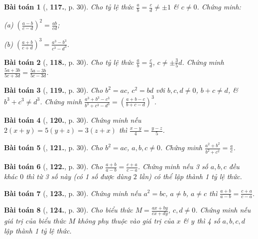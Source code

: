 \documentclass{article}
\numberwithin{equation}{section}
\newtheorem{baitoan}{Bài toán}
\begin{document}
\begin{baitoan}[\cite{Tuyen_Toan_7}, \textbf{117.}, p. 30]
	Cho tỷ lệ thức $\frac{a}{b} = \frac{c}{d}\ne\pm 1$ \& $c\ne 0$. Chứng minh:
	\begin{enumerate*}
		\item[(a)] $\left(\frac{a - b}{c - d}\right)^2 = \frac{ab}{cd}$;
		\item[(b)] $\left(\frac{a + b}{c + d}\right)^3 = \frac{a^3 - b^3}{c^3 - d^3}$.
	\end{enumerate*}
\end{baitoan}

\begin{baitoan}[\cite{Tuyen_Toan_7}, \textbf{118.}, p. 30]
	Cho tỷ lệ thức $\frac{a}{b} = \frac{c}{d}$, $c\ne\pm\frac{3}{5}d$. Chứng minh $\frac{5a + 3b}{5c + 3d} = \frac{5a - 3b}{5c - 3d}$.
\end{baitoan}

\begin{baitoan}[\cite{Tuyen_Toan_7}, \textbf{119.}, p. 30]
	Cho $b^2 = ac$, $c^2 = bd$ với $b,c,d\ne 0$, $b + c\ne d$, \& $b^3 + c^3\ne d^3$. Chứng minh $\frac{a^3 + b^3 - c^3}{b^3 + c^3 - d^3} = \left(\frac{a + b - c}{b + c - d}\right)^3$.
\end{baitoan}

\begin{baitoan}[\cite{Tuyen_Toan_7}, \textbf{120.}, p. 30]
	Chứng minh nếu $2(x + y) = 5(y + z) = 3(z + x)$ thì $\frac{x - y}{4} = \frac{y - z}{5}$.
\end{baitoan}

\begin{baitoan}[\cite{Tuyen_Toan_7}, \textbf{121.}, p. 30]
	Cho $b^2 = ac$, $a,b,c\ne 0$. Chứng minh $\frac{a^2 + b^2}{b^2 + c^2} = \frac{a}{c}$.
\end{baitoan}

\begin{baitoan}[\cite{Tuyen_Toan_7}, \textbf{122.}, p. 30]
	Cho $\frac{a + b}{a - b} = \frac{c + a}{c - a}$. Chứng minh nếu 3 số $a,b,c$ đều khác $0$ thì từ 3 số này (có 1 số được dùng $2$ lần) có thể lập thành 1 tỷ lệ thức.
\end{baitoan}

\begin{baitoan}[\cite{Tuyen_Toan_7}, \textbf{123.}, p. 30]
	Chứng minh nếu $a^2 = bc$, $a\ne b$, $a\ne c$ thì $\frac{a + b}{a - b} = \frac{c + a}{c - a}$.
\end{baitoan}

\begin{baitoan}[\cite{Tuyen_Toan_7}, \textbf{124.}, p. 30]
	Cho biểu thức $M = \frac{ax + by}{cx + dy}$, $c,d\ne 0$. Chứng minh nếu giá trị của biểu thức $M$ không phụ thuộc vào giá trị của $x$ \& $y$ thì 4 số $a,b,c,d$ lập thành 1 tỷ lệ thức.
\end{baitoan}
\end{document}
